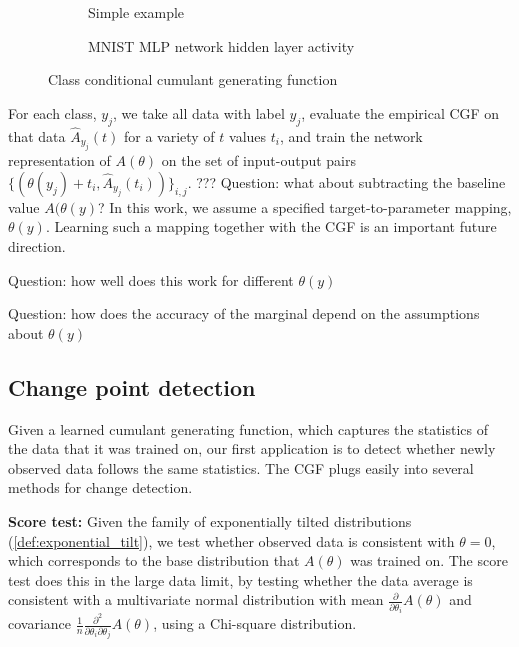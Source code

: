 \documentclass[11pt]{article}      %
\begin{document}
\begin{figure}[tb]
  \centering
  \begin{subfigure}[t]{\textwidth}
    \centering
    \caption{Simple example}
    \label{fig:2a_conditional_example}
  \end{subfigure}
  \begin{subfigure}[t]{\textwidth}
    \centering
    \caption{MNIST MLP network hidden layer activity}
    \label{fig:2b_conditional_MNIST}
  \end{subfigure}

  \caption{Class conditional cumulant generating function}
  \label{fig:2_class_conditional}
\end{figure}









For each class, $y_j$, we take all data with label $y_j$, evaluate the empirical CGF on that data $\hat A_{y_j}(t)$ for a variety of $t$ values $t_i$, and train the network representation of $A(\theta)$ on the set of input-output pairs $\{(\theta(y_j) + t_i, \hat A_{y_j}(t_i))\}_{i,j}$.
??? Question: what about subtracting the baseline value $A(\theta(y)$?
In this work, we assume a specified target-to-parameter mapping, $\theta(y)$.
Learning such a mapping together with the CGF is an important future direction.


Question: how well does this work for different $\theta(y)$

Question: how does the accuracy of the marginal depend on the assumptions about $\theta(y)$


\newpage
\subsection{Change point detection}
Given a learned cumulant generating function, which captures the statistics of the data that it was trained on, our first application is to detect whether newly observed data follows the same statistics.
The CGF plugs easily into several methods for change detection.

\noindent \textbf{Score test:} \cite{cox1979theoretical} 
Given the family of exponentially tilted distributions (\ref{def:exponential_tilt}), we test whether observed data is consistent with $\theta = 0$, which corresponds to the base distribution that $A(\theta)$ was trained on.
The score test does this in the large data limit, by testing whether the data average is consistent with a multivariate normal distribution with mean $\frac{\partial}{\partial \theta_i} A(\theta)$ and covariance $\frac{1}{n}\frac{\partial^2}{\partial \theta_i \partial \theta_j} A(\theta)$, using a Chi-square distribution.
\end{document}
